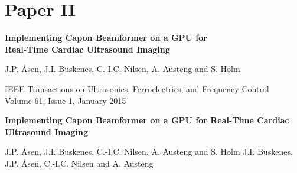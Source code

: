 {}



\ifMonolithic\else
   
\fi




\graphicspath{{../HRUIonGPU/}}
\ifMonolithic\else\fi
% 
\overfullrule=1mm
\cleardoublepage
\pagestyle{empty}

{
\setlength\parskip{\baselineskip}
\renewcommand\baselinestretch{1.1}


\chapter{Paper II}\label{ch:paperII}


{\Large\bf Implementing Capon Beamformer on a GPU for\\ Real-Time Cardiac Ultrasound Imaging}

J.P. Åsen, J.I. Buskenes, C.-I.C. Nilsen, A. Austeng and S. Holm

IEEE Transactions on Ultrasonics, Ferroelectrics, and Frequency Control\\
Volume 61, Issue 1, January 2015%
}


\cleardoublepage
\pagestyle{normal}
\thispagestyle{plain}

\begin{center}
{\Large\bf Implementing Capon Beamformer on a GPU for Real-Time Cardiac Ultrasound Imaging}

\vspace{\baselineskip}
J.P. Åsen, J.I. Buskenes, C.-I.C. Nilsen, A. Austeng and S. Holm
J.I. Buskenes, J.P. Åsen, C.-I.C. Nilsen and A. Austeng
\end{center}


{

   
}
   
% 
% 
%    


\ifMonolithic\else\fi